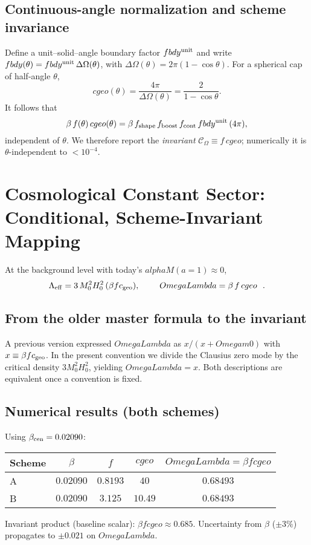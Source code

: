 \documentclass[aps,prd,onecolumn,superscriptaddress,nofootinbib]{revtex4-2}
\def\OmL{OmegaLambda}%
\def\Omm{Omega m0}%
\def\cgeo{cgeo}%
\def\alphaM{alphaM}%
\def\fbdy{fbdy}%
\def\boxed#1{#1}%
\newcommand{\OmL}{\Omega_\Lambda}
\newcommand{\Omm}{\Omega_{m0}}
\newcommand{\cgeo}{c_{\rm geo}}
\newcommand{\alphaM}{\alpha_M}
\newcommand{\fbdy}{f_{\rm bdy}}
\begin{document}
\subsection{Continuous-angle normalization and scheme invariance}
\label{sec:theta-invariance}
Define a unit--solid--angle boundary factor $\fbdy^{\rm unit}$ and write
$\fbdy(\theta)=\fbdy^{\rm unit}\,\Delta\Omega(\theta)$, with $\Delta\Omega(\theta)=2\pi(1-\cos\theta)$.
For a spherical cap of half-angle $\theta$,
\begin{equation}
\cgeo(\theta)=\frac{4\pi}{\Delta\Omega(\theta)}=\frac{2}{1-\cos\theta}.
\end{equation}
It follows that
\begin{equation}
\beta\,f(\theta)\,\cgeo(\theta)
= \beta\,f_{\rm shape}\,f_{\rm boost}\,f_{\rm cont}\,\fbdy^{\rm unit}\,(4\pi),
\end{equation}
independent of $\theta$. We therefore report the \emph{invariant} $\mathcal C_\Omega\equiv f\,\cgeo$; numerically it is $\theta$-independent to $<10^{-4}$.

\section{Cosmological Constant Sector: Conditional, Scheme-Invariant Mapping}
\label{sec:OmegaL}
At the background level with today’s $\alphaM(a{=}1)\approx 0$,
\begin{equation}
\Lambda_{\rm eff} = 3\,M_0^2 H_0^2\,(\beta f c_{\rm geo}),\qquad
\boxed{\ \OmL = \beta\, f \, \cgeo\ }\ .
\end{equation}

\subsection{From the older master formula to the invariant}
A previous version expressed $\OmL$ as $x/(x+\Omm)$ with $x\equiv \beta f c_{\rm geo}$. In the present convention we divide the Clausius zero mode by the critical density $3M_0^2H_0^2$, yielding $\OmL=x$. Both descriptions are equivalent once a convention is fixed.

\subsection{Numerical results (both schemes)}
\label{sec:numerics}
Using $\beta_{\rm cen}=0.02090$:
\begin{center}
\begin{tabular}{l|c|c|c|c}
\hline
Scheme & $\beta$ & $f$ & $\cgeo$ & $\OmL=\beta f \cgeo$ \\
\hline
A & $0.02090$ & $0.8193$ & $40$ & $0.68493$ \\
B & $0.02090$ & $3.125$ & $10.49$ & $0.68493$ \\
\hline
\end{tabular}
\end{center}
Invariant product (baseline scalar): $\beta f \cgeo \approx 0.685$. Uncertainty from $\beta$ ($\pm3\%$) propagates to $\pm 0.021$ on $\OmL$.
\end{document}
